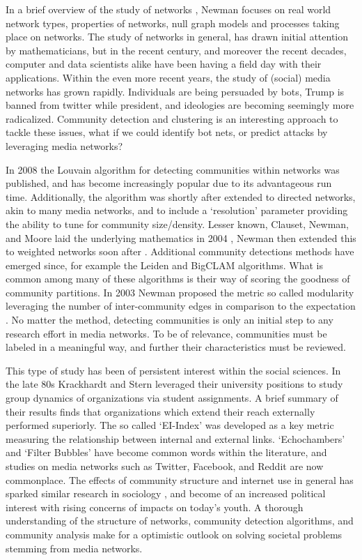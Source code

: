 \documentclass[a4paper, 12pt, twocolumn]{article}
\begin{document}
In a brief overview of the study of networks \cite{struc_funct_cnets}, Newman focuses on real world network types, properties of networks, null graph models and processes taking place on networks.
The study of networks in general, has drawn initial attention by mathematicians, but in the recent century, and moreover the recent decades, computer and data scientists alike have been having a field day with their applications.
Within the even more recent years, the study of (social) media networks has grown rapidly.
Individuals are being persuaded by bots, Trump is banned from twitter while president, and ideologies are becoming seemingly more radicalized.
Community detection and clustering is an interesting approach to tackle these issues, what if we could identify bot nets, or predict attacks by leveraging media networks?

In 2008 the Louvain algorithm \cite{louvain} for detecting communities within networks was published, and has become increasingly popular due to its advantageous run time.
Additionally, the algorithm was shortly after extended to directed networks, akin to many media networks, and to include a `resolution' parameter \cite{louvain_resolution, com_struct_indir} providing the ability to tune for community size/density.
Lesser known, Clauset, Newman, and Moore laid the underlying mathematics in 2004 \cite{finding_comm_struct}, Newman then extended this to weighted networks soon after \cite{analysis_of_wnets}.
Additional community detections methods have emerged since, for example the Leiden \cite{louvain_2_leiden} and BigCLAM \cite{bigclam} algorithms.
What is common among many of these algorithms is their way of scoring the goodness of community partitions.
In 2003 Newman proposed the metric so called modularity leveraging the number of inter-community edges in comparison to the expectation \cite{finding_and_evaling_comm_struct}.
No matter the method, detecting communities is only an initial step to any research effort in media networks.
To be of relevance, communities must be labeled in a meaningful way, and further their characteristics must be reviewed.

This type of study has been of persistent interest within the social sciences.
In the late 80s Krackhardt and Stern \cite{inet_crises} leveraged their university positions to study group dynamics of organizations via student assignments.
A brief summary of their results finds that organizations which extend their reach externally performed superiorly.
The so called `EI-Index' was developed as a key metric measuring the relationship between internal and external links.
`Echochambers' and `Filter Bubbles' have become common words within the literature, and studies on media networks such as Twitter, Facebook, and Reddit \cite{eko_weko, sm_ece, ekoin_ekobtwin} are now commonplace.
The effects of community structure and internet use in general has sparked similar research in sociology \cite{antisocial, eko_and_episteme, conspiracies_online, captivating}, and become of an increased political interest with rising concerns of impacts on today's youth.
A thorough understanding of the structure of networks, community detection algorithms, and community analysis make for a optimistic outlook on solving societal problems stemming from media networks.
\end{document}
